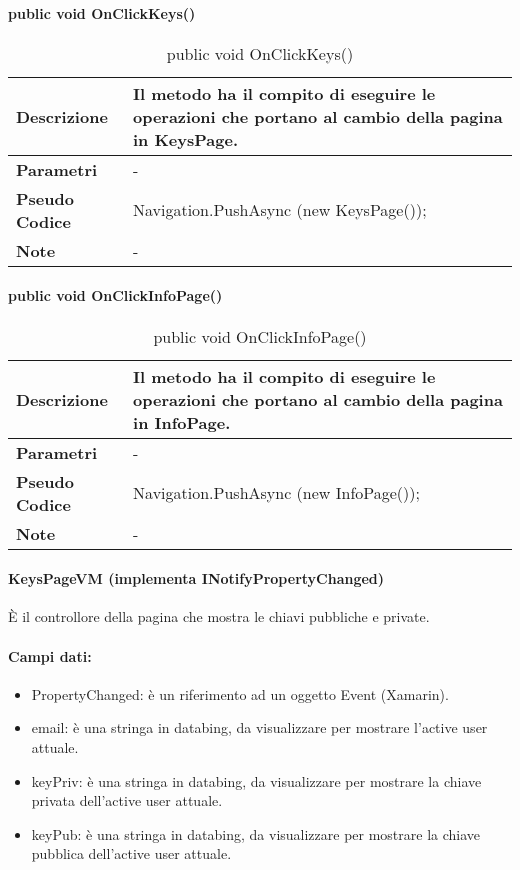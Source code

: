 \paragraph{public void OnClickKeys()}
\begin{center}
    \begin{longtable}{|p{3cm}|p{9cm}|}%
    \caption{public void OnClickKeys()}
    \endfirsthead
    \endhead
    \hline
    \textbf{Descrizione} & Il metodo ha il compito di eseguire le operazioni che portano al cambio della pagina in KeysPage.\\
    \hline
    \textbf{Parametri} &      
    -
    \\
    \hline
    \textbf{Pseudo Codice} & 
    Navigation.PushAsync (new KeysPage());
    \\
    \hline
    \textbf{Note} & 
    -
    \\
    \hline
    \end{longtable}
\end{center}



\paragraph{public void OnClickInfoPage()}
\begin{center}
    \begin{longtable}{|p{3cm}|p{9cm}|}%
    \caption{public void OnClickInfoPage()}
    \endfirsthead
    \endhead
    \hline
    \textbf{Descrizione} & Il metodo ha il compito di eseguire le operazioni che portano al cambio della pagina in InfoPage.\\
    \hline
    \textbf{Parametri} &      
    -
    \\
    \hline
    \textbf{Pseudo Codice} & 
    Navigation.PushAsync (new InfoPage());
    \\
    \hline
    \textbf{Note} & 
    -
    \\
    \hline
    \end{longtable}
\end{center}

\paragraph{KeysPageVM (implementa INotifyPropertyChanged)}
È il controllore della pagina che mostra le chiavi pubbliche e private.
\paragraph{Campi dati:}
\begin{itemize}
    \item PropertyChanged: è un riferimento ad un oggetto Event (Xamarin).
    \item email: è una stringa in databing, da visualizzare per mostrare l’active user attuale. 
    \item keyPriv: è una stringa in databing, da visualizzare per mostrare la chiave privata dell’active user attuale. 
    \item keyPub: è una stringa in databing, da visualizzare per mostrare la chiave pubblica dell’active user attuale. 
\end{itemize}

